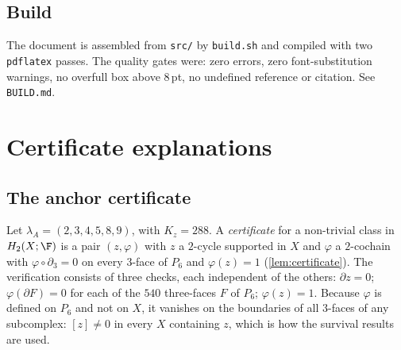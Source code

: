 \section{Build}
The document is assembled from \texttt{src/} by \texttt{build.sh} and compiled with two \texttt{pdflatex} passes. The quality gates were: zero errors, zero font-substitution warnings, no overfull box above $8$\,pt, no undefined reference or citation. See \texttt{BUILD.md}.

\chapter{Certificate explanations}\label{app:certs}
\section{The anchor certificate}
Let $\lambda_A=(2,3,4,5,8,9)$, with $K_z=288$. A \emph{certificate} for a non-trivial class in $H_2(X;\F)$ is a pair $(z,\varphi)$ with $z$ a $2$-cycle supported in $X$ and $\varphi$ a $2$-cochain with $\varphi\circ\partial_3=0$ on every $3$-face of $P_6$ and $\varphi(z)=1$ (\cref{lem:certificate}). The verification consists of three checks, each independent of the others: $\partial z=0$; $\varphi(\partial F)=0$ for each of the $540$ three-faces $F$ of $P_6$; $\varphi(z)=1$. Because $\varphi$ is defined on $P_6$ and not on $X$, it vanishes on the boundaries of all $3$-faces of any subcomplex: $[z]\ne0$ in every $X$ containing $z$, which is how the survival results are used.

